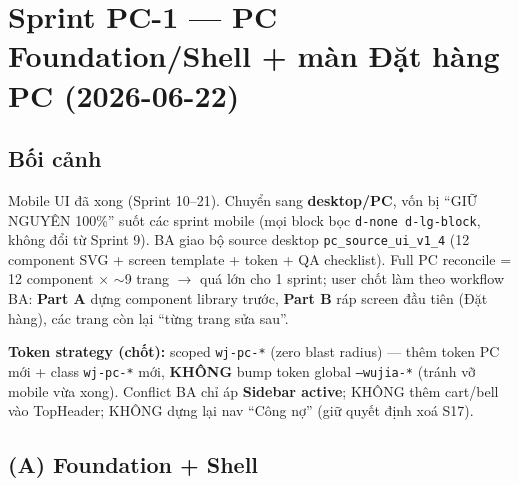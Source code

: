 \chapter{Sprint PC-1 --- PC Foundation/Shell + màn Đặt hàng PC (2026-06-22)}

\section{Bối cảnh}

Mobile UI đã xong (Sprint 10--21). Chuyển sang \textbf{desktop/PC}, vốn bị ``GIỮ NGUYÊN 100\%''
suốt các sprint mobile (mọi block bọc \texttt{d-none d-lg-block}, không đổi từ Sprint 9). BA giao bộ
source desktop \texttt{pc\_source\_ui\_v1\_4} (12 component SVG + screen template + token + QA
checklist). Full PC reconcile = 12 component \(\times\) \(\sim\)9 trang \(\rightarrow\) quá lớn cho 1
sprint; user chốt làm theo workflow BA: \textbf{Part A} dựng component library trước, \textbf{Part B}
ráp screen đầu tiên (Đặt hàng), các trang còn lại ``từng trang sửa sau''.

\textbf{Token strategy (chốt):} scoped \texttt{wj-pc-*} (zero blast radius) --- thêm token PC mới +
class \texttt{wj-pc-*} mới, \textbf{KHÔNG} bump token global \texttt{--wujia-*} (tránh vỡ mobile vừa
xong). Conflict BA chỉ áp \textbf{Sidebar active}; KHÔNG thêm cart/bell vào TopHeader; KHÔNG dựng lại
nav ``Công nợ'' (giữ quyết định xoá S17).

\section{(A) Foundation + Shell}

